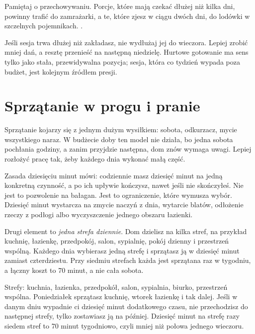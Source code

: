 Pamiętaj o przechowywaniu. Porcje, które mają czekać dłużej niż kilka dni,
powinny trafić do zamrażarki, a te, które zjesz w ciągu dwóch dni, do
lodówki w szczelnych pojemnikach. .

Jeśli sesja trwa dłużej niż zakładasz, nie wydłużaj jej do wieczora.
Lepiej zrobić mniej dań, a resztę przenieść na następną niedzielę. Hurtowe
gotowanie ma sens tylko jako stała, przewidywalna pozycja; sesja, która
co tydzień wypada poza budżet, jest kolejnym źródłem presji.

\section{Sprzątanie w progu i pranie}

Sprzątanie kojarzy się z jednym dużym wysiłkiem: sobota, odkurzacz, mycie
wszystkiego naraz. W budżecie doby ten model nie działa, bo jedna sobota
pochłania godziny, a zanim przyjdzie następna, dom znów wymaga uwagi. Lepiej
rozłożyć pracę tak, żeby każdego dnia wykonać małą część.

Zasada dziesięciu minut mówi: codziennie masz dziesięć minut na jedną
konkretną czynność, a po ich upływie kończysz, nawet jeśli nie skończyłeś.
Nie jest to pozwolenie na bałagan. Jest to ograniczenie, które wymusza
wybór. Dziesięć minut wystarcza na zmycie naczyń z dnia, wytarcie blatów,
odłożenie rzeczy z podłogi albo wyczyszczenie jednego obszaru łazienki.

Drugi element to \emph{jedna strefa dziennie}. Dom dzielisz na kilka
stref, na przykład kuchnię, łazienkę, przedpokój, salon, sypialnię, pokój
dzienny i przestrzeń wspólną. Każdego dnia wybierasz jedną strefę i
sprzątasz ją w dziesięć minut zamiast czterdziestu. Przy siedmiu strefach
każda jest sprzątana raz w tygodniu, a łączny koszt to 70 minut, a nie cała
sobota.

\begin{przyklad}
Strefy: kuchnia, łazienka, przedpokół, salon, sypialnia, biurko, przestrzeń
wspólna. Poniedziałek sprzątasz kuchnię, wtorek łazienkę i tak dalej.
Jeśli w danym dniu wypadnie ci dziesięć minut dodatkowego czasu, nie
przechodzisz do następnej strefy, tylko zostawiasz ją na później. Dziesięć
minut na strefę razy siedem stref to 70 minut tygodniowo, czyli mniej niż
połowa jednego wieczoru.
\end{przyklad}

